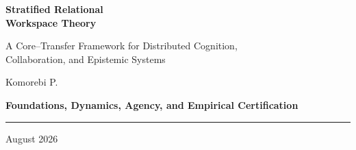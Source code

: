 \documentclass[11pt,letterpaper]{article}
\theoremstyle{plain}
\theoremstyle{definition}
\begin{document}

\begin{titlepage}
\thispagestyle{empty}
\centering
\vspace*{1.2in}
{\Huge\bfseries\color{PartColor} Stratified Relational\\[0.18em] Workspace Theory\par}
\vspace{0.55in}
{\Large A Core--Transfer Framework for Distributed Cognition,\\ Collaboration, and Epistemic Systems\par}
\vspace{0.8in}
{\large Komorebi P.\par}
\vspace{0.65in}
{\large\bfseries Foundations, Dynamics, Agency, and Empirical Certification\par}
\vfill
{\color{RuleColor}\rule{0.70\textwidth}{0.8pt}\par}
\vspace{0.25in}
{\small August 2026\par}
\end{titlepage}
\clearpage
{}
\end{document}
